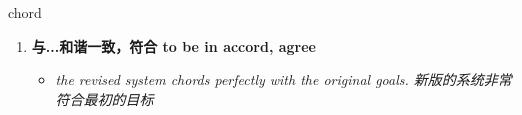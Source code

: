 
\begin{frame}
{\huge chord}
\begin{center}
\begin{enumerate}\Large
  \item \textbf{与...和谐一致，符合 to be in accord, agree}
  \begin{itemize}
    \item \em{\Large{the revised system chords perfectly with the original goals. 新版的系统非常符合最初的目标}}
  \end{itemize}
\end{enumerate}
\end{center}
\end{frame}
